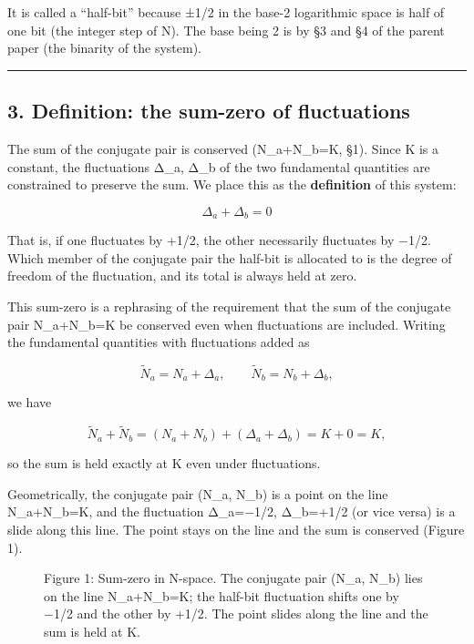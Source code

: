 \documentclass[11pt]{ltjsarticle}
\providecommand{\pandocbounded}[1]{#1}
\begin{document}
It is called a ``half-bit'' because ±1/2 in the base-2 logarithmic space
is half of one bit (the integer step of N). The base being 2 is by §3
and §4 of the parent paper (the binarity of the system).

\begin{center}\rule{0.5\linewidth}{0.5pt}\end{center}

\subsection{3. Definition: the sum-zero of
fluctuations}\label{definition-the-sum-zero-of-fluctuations}

The sum of the conjugate pair is conserved (N\_a+N\_b=K, §1). Since K is
a constant, the fluctuations Δ\_a, Δ\_b of the two fundamental
quantities are constrained to preserve the sum. We place this as the
\textbf{definition} of this system:

\[\boxed{\ \Delta_a + \Delta_b = 0\ }\]

That is, if one fluctuates by +1/2, the other necessarily fluctuates by
−1/2. Which member of the conjugate pair the half-bit is allocated to is
the degree of freedom of the fluctuation, and its total is always held
at zero.

This sum-zero is a rephrasing of the requirement that the sum of the
conjugate pair N\_a+N\_b=K be conserved even when fluctuations are
included. Writing the fundamental quantities with fluctuations added as

\[\tilde N_a = N_a + \Delta_a, \qquad \tilde N_b = N_b + \Delta_b,\]

we have

\[\tilde N_a + \tilde N_b = (N_a+N_b) + (\Delta_a+\Delta_b) = K + 0 = K,\]

so the sum is held exactly at K even under fluctuations.

Geometrically, the conjugate pair (N\_a, N\_b) is a point on the line
N\_a+N\_b=K, and the fluctuation Δ\_a=−1/2, Δ\_b=+1/2 (or vice versa) is
a slide along this line. The point stays on the line and the sum is
conserved (Figure 1).

\begin{figure}
\centering
\pandocbounded{}
\caption{Figure 1: Sum-zero in N-space. The conjugate pair (N\_a, N\_b)
lies on the line N\_a+N\_b=K; the half-bit fluctuation shifts one by
−1/2 and the other by +1/2. The point slides along the line and the sum
is held at K.}
\end{figure}
\end{document}
